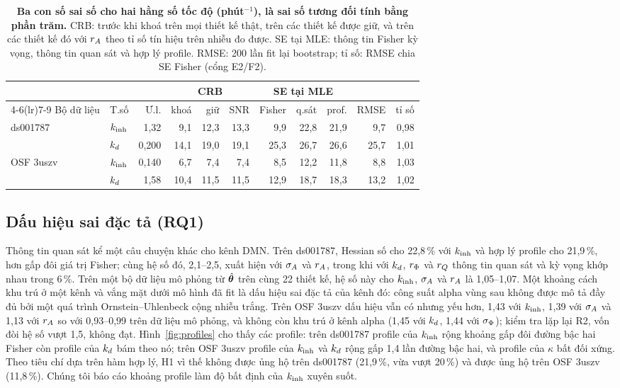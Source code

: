 \begin{table}[t]
\caption{\textbf{Ba con số sai số cho hai hằng số tốc độ (phút$^{-1}$), là sai số tương đối tính bằng phần trăm.} CRB: trước khi khoá trên mọi thiết kế thật, trên các thiết kế được giữ, và trên các thiết kế đó với $r_{A}$ theo tỉ số tín hiệu trên nhiễu đo được. SE tại MLE: thông tin Fisher kỳ vọng, thông tin quan sát và hợp lý profile. RMSE: 200 lần fit lại bootstrap; tỉ số: RMSE chia SE Fisher (cổng E2/F2).}
\label{tab:errors}
\centering\scriptsize
\setlength{\tabcolsep}{2.2pt}
\begin{tabular}{llrrrrrrrrr}
\toprule
 & & & \multicolumn{3}{c}{CRB} & \multicolumn{3}{c}{SE tại MLE} & & \\
\cmidrule(lr){4-6}\cmidrule(lr){7-9}
Bộ dữ liệu & T.số & Ư.l. & khoá & giữ & SNR & Fisher & q.sát & prof. & RMSE & tỉ số \\
\midrule
ds001787  & $k_{\mathrm{inh}}$ & 1,32  & 9,1  & 12,3 & 13,3 & 9,9  & 22,8 & 21,9 & 9,7  & 0,98 \\
          & $k_{d}$   & 0,200 & 14,1 & 19,0 & 19,1 & 25,3 & 26,7 & 26,6 & 25,7 & 1,01 \\
OSF 3uszv & $k_{\mathrm{inh}}$ & 0,140 & 6,7  & 7,4  & 7,4  & 8,5  & 12,2 & 11,8 & 8,8  & 1,03 \\
          & $k_{d}$   & 1,58  & 10,4 & 11,5 & 11,5 & 12,9 & 18,7 & 18,3 & 13,2 & 1,02 \\
\bottomrule
\end{tabular}
\end{table}

\subsection{Dấu hiệu sai đặc tả (RQ1)}
Thông tin quan sát kể một câu chuyện khác cho kênh DMN. Trên ds001787, Hessian số cho 22,8\,\% với $k_{\mathrm{inh}}$ và hợp lý profile cho 21,9\,\%, hơn gấp đôi giá trị Fisher; cùng hệ số đó, 2,1--2,5, xuất hiện với $\sigma_{A}$ và $r_{A}$, trong khi với $k_{d}$, $r_{\Phi}$ và $r_{Q}$ thông tin quan sát và kỳ vọng khớp nhau trong 6\,\%. Trên một bộ dữ liệu mô phỏng từ $\hat{\boldsymbol{\theta}}$ trên cùng 22 thiết kế, hệ số này cho $k_{\mathrm{inh}}$, $\sigma_{A}$ và $r_{A}$ là 1,05--1,07. Một khoảng cách khu trú ở một kênh và vắng mặt dưới mô hình đã fit là dấu hiệu sai đặc tả của kênh đó: công suất alpha vùng sau không được mô tả đầy đủ bởi một quá trình Ornstein--Uhlenbeck cộng nhiễu trắng. Trên OSF 3uszv dấu hiệu vẫn có nhưng yếu hơn, 1,43 với $k_{\mathrm{inh}}$, 1,39 với $\sigma_{A}$ và 1,13 với $r_{A}$ so với 0,93--0,99 trên dữ liệu mô phỏng, và không còn khu trú ở kênh alpha (1,45 với $k_{d}$, 1,44 với $\sigma_{\Phi}$); kiểm tra lặp lại R2, vốn đòi hệ số vượt 1,5, không đạt. Hình~\ref{fig:profiles} cho thấy các profile: trên ds001787 profile của $k_{\mathrm{inh}}$ rộng khoảng gấp đôi đường bậc hai Fisher còn profile của $k_{d}$ bám theo nó; trên OSF 3uszv profile của $k_{\mathrm{inh}}$ và $k_{d}$ rộng gấp 1,4 lần đường bậc hai, và profile của $\kappa$ bất đối xứng. Theo tiêu chí dựa trên hàm hợp lý, H1 vì thế không được ủng hộ trên ds001787 (21,9\,\%, vừa vượt 20\,\%) và được ủng hộ trên OSF 3uszv (11,8\,\%). Chúng tôi báo cáo khoảng profile làm độ bất định của $k_{\mathrm{inh}}$ xuyên suốt.

